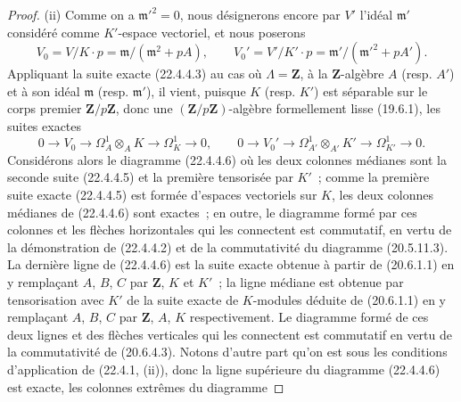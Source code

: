 \begin{proof}
(ii) Comme on a $\mathfrak m'^2=0$, nous désignerons encore par $V'$ l'idéal
$\mathfrak m'$ considéré comme $K'$-espace vectoriel, et nous poserons
\begin{equation}
\label{0.22.4.4.4-fr}
  V_0=V/K\cdot p=\mathfrak m/(\mathfrak m^2+pA),\qquad
  V_0'=V'/K'\cdot p=\mathfrak m'/(\mathfrak m'^2+pA').
  \tag{22.4.4.4}
\end{equation}
Appliquant la suite exacte (22.4.4.3) au cas où $\Lambda=\mathbf Z$, à la
$\mathbf Z$-algèbre $A$ (resp. $A'$) et à son idéal $\mathfrak m$
(resp. $\mathfrak m'$), il vient, puisque $K$ (resp. $K'$) est séparable sur
le corps premier $\mathbf Z/p\mathbf Z$, donc une
$(\mathbf Z/p\mathbf Z)$-algèbre formellement lisse (19.6.1), les suites
exactes
\begin{equation}
\label{0.22.4.4.5-fr}
  0\longrightarrow V_0\longrightarrow\Omega^1_A\otimes_AK
  \longrightarrow\Omega^1_K\longrightarrow0,\qquad
  0\longrightarrow V_0'\longrightarrow\Omega^1_{A'}\otimes_{A'}K'
  \longrightarrow\Omega^1_{K'}\longrightarrow0.
  \tag{22.4.4.5}
\end{equation}
Considérons alors le diagramme (22.4.4.6) où les deux colonnes médianes sont
la seconde suite (22.4.4.5) et la première tensorisée par $K'$~; comme la
première suite exacte (22.4.4.5) est formée d'espaces vectoriels sur $K$,
les deux colonnes médianes de (22.4.4.6) sont exactes~; en outre, le
diagramme formé par ces colonnes et les flèches horizontales qui les
connectent est commutatif, en vertu de la démonstration de (22.4.4.2) et de
la commutativité du diagramme (20.5.11.3). La dernière ligne de (22.4.4.6)
est la suite exacte obtenue à partir de (20.6.1.1) en y remplaçant $A$, $B$,
$C$ par $\mathbf Z$, $K$ et $K'$~; la ligne médiane est obtenue par
tensorisation avec $K'$ de la suite exacte de $K$-modules déduite de
(20.6.1.1) en y remplaçant $A$, $B$, $C$ par $\mathbf Z$, $A$, $K$
respectivement. Le diagramme formé de ces deux lignes et des flèches
verticales qui les connectent est commutatif en vertu de la commutativité de
(20.6.4.3). Notons d'autre part qu'on est sous les conditions d'application
de (22.4.1, (ii)), donc la ligne supérieure du diagramme (22.4.4.6) est
exacte, les colonnes extrêmes du diagramme



\end{proof}
